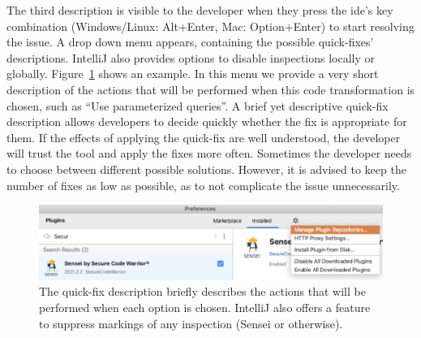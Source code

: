 The third description is visible to the developer when they press the \gls{ide}’s key combination (Windows/Linux: Alt+Enter, Mac: Option+Enter) to start resolving the issue.
A drop down menu appears, containing the possible quick-fixes' descriptions.
IntelliJ also provides options to disable inspections locally or globally. Figure~\ref{fig:qfdescription} shows an example.
In this menu we provide a very short description of the actions that will be performed when this code transformation is chosen, such as “Use parameterized queries”.
A brief yet descriptive quick-fix description allows developers to decide quickly whether the fix is appropriate for them.
If the effects of applying the quick-fix are well understood, the developer will trust the tool and apply the fixes more often.
Sometimes the developer needs to choose between different possible solutions.
However, it is advised to keep the number of fixes as low as possible, as to not complicate the issue unnecessarily.

\begin{figure}[t]
  \centering
  \includegraphics[width=\textwidth,page=5]{04-tools/figures/figures2.pdf}
  \caption[Example of the quick-fix description.]{The quick-fix description briefly describes the actions that will be performed when each option is chosen. IntelliJ also offers a feature to suppress markings of any inspection (Sensei or otherwise).}
  \label{fig:qfdescription} 
\end{figure}
